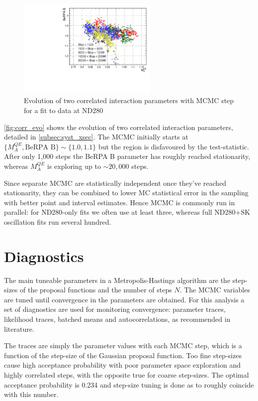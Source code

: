 \begin{figure}[h]
	\includegraphics[width=0.6\textwidth, trim={0mm 0mm 0mm 0mm}, clip,page=1]{figures/mcmc/corr_maqe_berpab}
	\caption{Evolution of two correlated interaction parameters with MCMC step for a fit to data at ND280}
	\label{fig:corr_evo}
\end{figure}
\autoref{fig:corr_evo} shows the evolution of two correlated interaction parameters, detailed in \autoref{subsec:syst_xsec}. The MCMC initially starts at $\{M_A^{QE}, \text{BeRPA B}\} \sim \{1.0, 1.1\}$ but the region is disfavoured by the test-statistic. After only 1,000 steps the BeRPA B parameter has roughly reached stationarity, whereas $M_A^{QE}$ is exploring up to $\sim20,000$ steps.

Since separate MCMC are statistically independent once they've reached stationarity, they can be combined to lower MC statistical error in the sampling with better point and interval estimates. Hence MCMC is commonly run in parallel: for ND280-only fits we often use at least three, whereas full ND280+SK oscillation fits run several hundred.

\section{Diagnostics}
The main tuneable parameters in a Metropolis-Hastings algorithm are the step-sizes of the proposal functions and the number of steps $N$. The MCMC variables are tuned until convergence in the parameters are obtained. For this analysis a set of diagnostics are used for monitoring convergence: parameter traces, likelihood traces, batched means and autocorrelations, as recommended in literature\cite{mcmc_handbook}.

The traces are simply the parameter values with each MCMC step, which is a function of the step-size of the Gaussian proposal function. Too fine step-sizes cause high acceptance probability with poor parameter space exploration and highly correlated steps, with the opposite true for coarse step-sizes. The optimal acceptance probability is 0.234\cite{step_prop,mcmc_handbook} and step-size tuning is done as to roughly coincide with this number.

